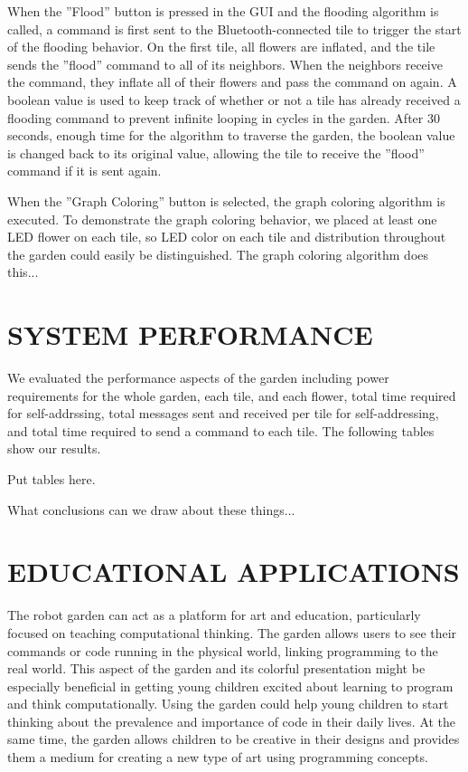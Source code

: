 \documentclass[letterpaper, 10 pt, conference]{ieeeconf}  %
\begin{document}
When the ''Flood'' button is pressed in the GUI and the flooding algorithm is called, a command is first sent to the Bluetooth-connected tile to trigger the start of the flooding behavior.  On the first tile, all flowers are inflated, and the tile sends the ''flood'' command to all of its neighbors.  When the neighbors receive the command, they inflate all of their flowers and pass the command on again.  A boolean value is used to keep track of whether or not a tile has already received a flooding command to prevent infinite looping in cycles in the garden.  After 30 seconds, enough time for the algorithm to traverse the garden, the boolean value is changed back to its original value, allowing the tile to receive the ''flood'' command if it is sent again.

When the ''Graph Coloring'' button is selected, the graph coloring algorithm is executed.  To demonstrate the graph coloring behavior, we placed at least one LED flower on each tile, so LED color on each tile and distribution throughout the garden  could easily be distinguished.  The graph coloring algorithm does this...

\section{SYSTEM PERFORMANCE}
We evaluated the performance aspects of the garden including power requirements for the whole garden, each tile, and each flower, total time required for self-addrssing, total messages sent and received per tile for self-addressing, and total time required to send a command to each tile.  The following tables show our results.

Put tables here.

What conclusions can we draw about these things...

\section{EDUCATIONAL APPLICATIONS}
The robot garden can act as a platform for art and education, particularly focused on teaching computational thinking.  The garden allows users to see their commands or code running in the physical world, linking programming to the real world.   This aspect of the garden and its colorful presentation might be especially beneficial in getting young children excited about learning to program and think computationally.  Using the garden could help young children to start thinking about the prevalence and importance of code in their daily lives.  At the same time, the garden allows children to be creative in their designs and provides them a medium for creating a new type of art using programming concepts.  
\end{document}
